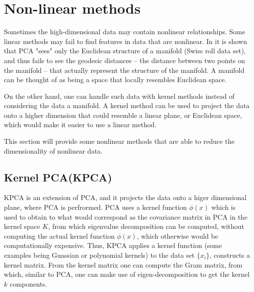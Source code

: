 \section*{Non-linear methods}
Sometimes the high-dimensional data may contain nonlinear relationships. Some linear methods may fail to find features in data that are nonlinear. In \cite{Tennenbaum} it is shown that PCA "sees" only the Euclidean structure of a manifold (Swiss roll data set), and thus fails to see the geodesic distances -- the distance between two points on the manifold -- that actually represent the structure of the manifold. A manifold can be thought of as being a space that locally resembles Euclidean space.

On the other hand, one can handle such data with kernel methods instead of considering the data a manifold. A kernel method can be used to project the data onto a higher dimension that could resemble a linear plane, or Euclidean space, which would make it easier to use a linear method. \cite{LVD}

This section will provide some nonlinear methods that are able to reduce the dimensionality of nonlinear data.


\usepackage{comment}

\begin{comment}
    @misc{Tennenbaum,
      url        = {https://wearables.cc.gatech.edu/paper\_of\_week/isomap.pdf},
      title      =  {A Global Geometric Framework for Nonlinear Dimensionality Reduction}
      author       = {Joshua B. Tennenbaum, Vin de Silva, John C. Langford},
      urldate      = {2022-10-11}
    }
\end{comment}
\subsection*{Kernel PCA(KPCA)}
KPCA is an extension of PCA, and it projects the data onto a higer dimensional plane, where PCA is perfrormed. PCA uses a kernel function $\phi (x)$ which is used to obtain to what would correspond as the covariance matrix in PCA in the kernel space $K$, from which eigenvalue decomposition can be computed, without computing the actual kernel function $\phi (x)$, which otherwise would be computationally expensive. Thus, KPCA applies a kernel function (some examples being Guassian or polynomial kernels) to the data set $ \{x_{i} \}$, constructs a kernel matrix. From the kernel matrix one can compute the Gram matrix, from which, similar to PCA, one can make use of eigen-decomposition to get the kernel $k$ components. \cite{KPCA}

